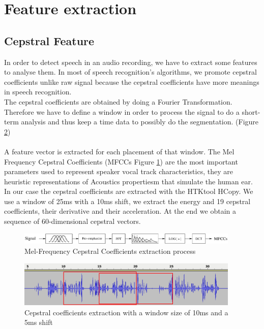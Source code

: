 \documentclass{techrep} %
\begin{document}
\section{Feature extraction}
\subsection{Cepstral Feature}
In order to detect speech in an audio recording, we have to extract
some features to analyse them. In most of speech recognition's
algorithms, we promote cepstral coefficients unlike raw signal because
the cepstral coefficients have more meanings in speech
recognition.\\ The cepstral coefficients are obtained by doing a
Fourier Transformation. Therefore we have to define a window in order
to process the signal to do a short-term analysis and thus keep a time
data to possibly do the segmentation. (Figure \ref{extractmfcc})\\\\ A
feature vector is extracted for each placement of that window. The Mel
Frequency Cepstral Coefficients (MFCCs Figure
\ref{extractmfccprocess}) are the most important parameters used to
represent speaker vocal track characteristics, they are heuristic
representations of Acoustics propertiesm that simulate the human
ear.\\ In our case the cepstral coefficients are extracted with the
HTKtool HCopy. We use a window of 25ms with a 10ms shift, we extract
the energy and 19 cepstral coefficients, their derivative and their
acceleration. At the end we obtain a sequence of 60-dimensional
cepstral vectors.

\begin{figure}[H]
  \centering
  \includegraphics[width=400px]{extract_mfcc_process}
  \caption{Mel-Frequency Cepstral Coefficients extraction process}
  \label{extractmfccprocess}
\end{figure}
\begin{figure}[H]
  \centering \includegraphics[width=400px]{extract_mfcc}
  \caption{Cepstral coefficients extraction with a window size of 10ms
    and a 5ms shift}
  \label{extractmfcc}
\end{figure}
\end{document}
